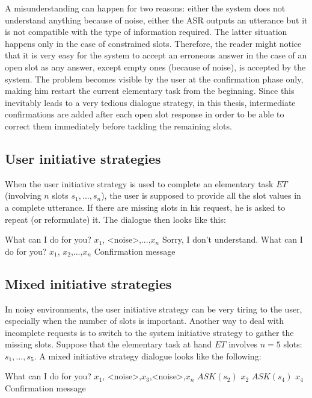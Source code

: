 		A misunderstanding can happen for two reasons: either the system does not understand anything because of noise, either the ASR outputs an utterance but it is not compatible with the type of information required. The latter situation happens only in the case of constrained slots. Therefore, the reader might notice that it is very easy for the system to accept an erroneous answer in the case of an open slot as any answer, except empty ones (because of noise), is accepted by the system. The problem becomes visible by the user at the confirmation phase only, making him restart the current elementary task from the beginning. Since this inevitably leads to a very tedious dialogue strategy, in this thesis, intermediate confirmations are added after each open slot response in order to be able to correct them immediately before tackling the remaining slots.
	
	\subsection{User initiative strategies}
	
		When the user initiative strategy is used to complete an elementary task $ET$ (involving $n$ slots $s_1,...,s_n$), the user is supposed to provide all the slot values in a complete utterance. If there are missing slots in his request, he is asked to repeat (or reformulate) it. The dialogue then looks like this:
		
		\begin{dialogue}
			 What can I do for you?
			 $x_1$, <noise>,...,$x_n$
			 Sorry, I don't understand. What can I do for you?
			 $x_1$, $x_2$,...,$x_n$
			 Confirmation message
		\end{dialogue}
	
	\subsection{Mixed initiative strategies}
	
		In noisy environments, the user initiative strategy can be very tiring to the user, especially when the number of slots is important. Another way to deal with incomplete requests is to switch to the system initiative strategy to gather the missing slots. Suppose that the elementary task at hand $ET$ involves $n=5$ slots: $s_1,...,s_5$. A mixed initiative strategy dialogue looks like the following:
		
		\begin{dialogue}
			 What can I do for you?
			 $x_1$, <noise>,$x_3$,<noise>,$x_n$
			 $ASK(s_2)$
			\speak{USER} $x_2$
			 $ASK(s_4)$
			\speak{USER} $x_4$
			 Confirmation message
		\end{dialogue}
	
